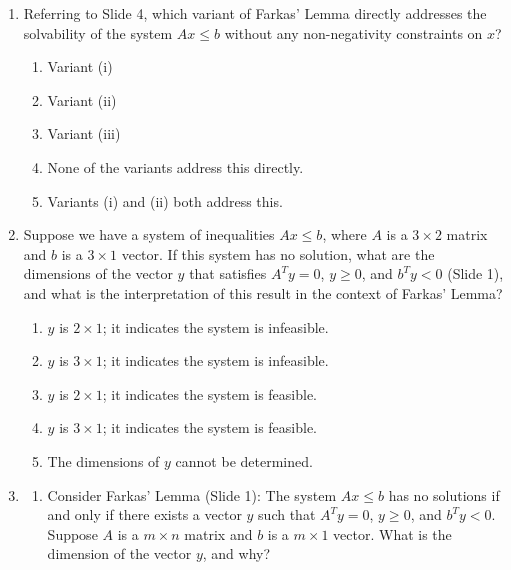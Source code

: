\documentclass{article}%
\begin{document}
\begin{enumerate}
\begin{enumerate}%
\item The dimension of $y$ is $3 \times 1$.%
\item The dimension of $y$ is $3 \times 5$.%
\item The dimension of $y$ is $5 \times 1$.%
\item The dimension of $y$ is $5 \times 3$.%
\item The dimension of $y$ cannot be determined.%
\end{enumerate}%
\vspace{1em}%
\item Referring to Slide 4, which variant of Farkas' Lemma directly addresses the solvability of the system $Ax \le b$ without any non-negativity constraints on $x$?%
\begin{enumerate}%
\item Variant (i)%
\item Variant (ii)%
\item Variant (iii)%
\item None of the variants address this directly.%
\item Variants (i) and (ii) both address this.%
\end{enumerate}%
\vspace{1em}%
\item Suppose we have a system of inequalities $Ax \le b$, where $A$ is a $3 \times 2$ matrix and $b$ is a $3 \times 1$ vector.  If this system has no solution, what are the dimensions of the vector $y$ that satisfies $A^T y = 0$, $y \ge 0$, and $b^T y < 0$ (Slide 1), and what is the interpretation of this result in the context of Farkas' Lemma?%
\begin{enumerate}%
\item $y$ is $2 \times 1$; it indicates the system is infeasible.%
\item $y$ is $3 \times 1$; it indicates the system is infeasible.%
\item $y$ is $2 \times 1$; it indicates the system is feasible.%
\item $y$ is $3 \times 1$; it indicates the system is feasible.%
\item The dimensions of $y$ cannot be determined.%
\end{enumerate}%
\vspace{1em}%
\item%
\begin{enumerate}%
\item Consider Farkas' Lemma (Slide 1): The system $Ax \le b$ has no solutions if and only if there exists a vector $y$ such that $A^T y = 0$, $y \ge 0$, and $b^T y < 0$.  Suppose $A$ is a $m \times n$ matrix and $b$ is a $m \times 1$ vector. What is the dimension of the vector $y$, and why?%

\end{enumerate}
\end{enumerate}
\end{document}
